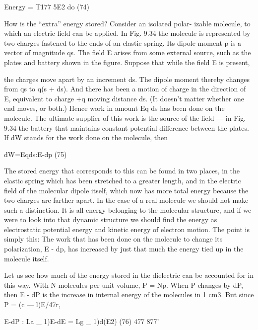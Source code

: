 {{\begin{equation}
\end{equation}
Energy = T177 5E2 do (74)

How is the ``extra'' energy stored? Consider an isolated polar-
izable molecule, to which an electric field can be applied. In Fig. 9.34
the molecule is represented by two charges fastened to the ends of
an elastic spring. Its dipole moment p is a vector of magnitude qs.
The field E arises from some external source, such as the plates and
battery shown in the figure. Suppose that while the field E is present,

the charges move apart by an increment ds. The dipole moment
thereby changes from qs to q(s + ds). And there has been a motion
of charge in the direction of E, equivalent to charge +q moving distance
ds. (It doesn't matter whether one end moves, or both.)
Hence work in amount Eq ds has been done on the molecule. The
ultimate supplier of this work is the source of the field --- in Fig. 9.34
the battery that maintains constant potential difference between the
plates. If dW stands for the work done on the molecule, then

\begin{equation}
\end{equation}
dW=Eqds:E-dp (75)

The stored energy that corresponds to this can be found in two
places, in the elastic spring which has been stretched to a greater
length, and in the electric field of the molecular dipole itself, which
now has more total energy because the two charges are farther apart.
In the case of a real molecule we should not make such a distinction.
It is all energy belonging to the molecular structure, and if we were
to look into that dynamic structure we should find the energy as
electrostatic potential energy and kinetic energy of electron motion.
The point is simply this: The work that has been done on the molecule
to change its polarization, E - dp, has increased by just that much
the energy tied up in the molecule itself.

Let us see how much of the energy stored in the dielectric can be
accounted for in this way. With N molecules per unit volume,
P = Np. When P changes by dP, then E - dP is the increase in internal
energy of the molecules in 1 cm3. But since P = (c  ---  l)E/47r,

\begin{equation}
\end{equation}
E-dP : La _ 1)E-dE = Lg _ 1)d(E2) (76)
477 877'

}}
